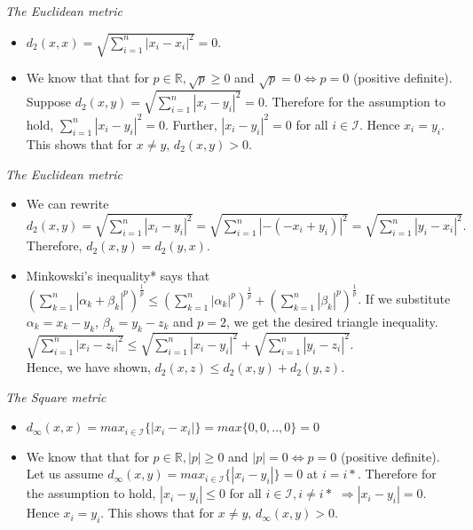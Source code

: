 \begin{frame}
\textit{The Euclidean metric}\hfill\break
\begin{itemize}
    \item $d_2(x,x) = \sqrt{\sum_{i=1}^{n} |x_i - x_i|^2} = 0$.\hfill\break
    \item We know
    that that for $p \in \mathbb{R}, \sqrt{p}\geq0$ and $\sqrt{p} = 0 \iff p =
    0$ (positive definite). \hfill\break
    \hfill\break
    Suppose $d_2(x,y) = \sqrt{\sum_{i=1}^{n} |x_i - y_i|^2} = 0$. \hfill\break
    \hfill\break
    Therefore for the assumption to hold,
    $\sum_{i=1}^{n} |x_i - y_i|^2 = 0$. Further, $ |x_i - y_i|^2 = 0$ for all $i
    \in \mathcal{I}$. Hence $x_i = y_i$. This shows that for $x\neq y$,
    $d_2(x,y)>0$.
\end{itemize}
\end{frame}


\begin{frame}
\textit{The Euclidean metric}\hfill\break
\begin{itemize}
    \item We can rewrite $d_2(x,y) = \sqrt{\sum_{i=1}^{n} |x_i - y_i|^2} =
    \sqrt{\sum_{i=1}^{n} |- (- x_i + y_i)|^2} = \sqrt{\sum_{i=1}^{n} |y_i - x_i|^2}.$ Therefore, $d_2(x,y) =
    d_2(y,x).$\hfill\break
    \pause
    \item Minkowski's inequality* says that
    $(\sum_{k=1}^{n}|\alpha_k+\beta_k|^p)^\frac{1}{p} \leq
    (\sum_{k=1}^{n}|\alpha_k|^p)^\frac{1}{p} +
    (\sum_{k=1}^{n}|\beta_k|^p)^\frac{1}{p}$.\hfill\break
    \hfill\break
    If we substitute $\alpha_k =
    x_k-y_k$, $\beta_k = y_k - z_k$ and $p=2$, we get the desired triangle inequality.\hfill\break
    $ \sqrt{\sum_{i=1}^{n} |x_i - z_i|^2} \leq  \sqrt{\sum_{i=1}^{n} |x_i -
    y_i|^2} +  \sqrt{\sum_{i=1}^{n} |y_i - z_i|^2}$. \\ Hence, we have shown,
    $d_2(x,z) \leq d_2(x,y)+d_2(y,z).$
\end{itemize}
\end{frame}

\begin{frame}
\textit{The Square metric}\hfill\break
\begin{itemize}
     \item $d_{\infty}(x,x) = max_{i\in \mathcal{I}}\{|x_i - x_i|\} = max\{0,
    0,..,0\} = 0$\hfill\break
    \item We know that that for $p \in \mathbb{R}, |p|\geq 0$ and $|p| = 0
    \iff p = 0$ (positive definite). \hfill\break
    \hfill\break
    Let us assume $d_{\infty}(x,y) = max_{i\in \mathcal{I}}\{|x_i - y_i|\} = 0$
    at $i=i*$. \hfill\break\hfill\break
    Therefore for the assumption to hold, $|x_i
    - y_i| \leq 0$ for all $i \in \mathcal{I}, i\neq i*$ $\Rightarrow |x_i -
    y_i| = 0$. Hence $x_i = y_i$. This shows that
    for $x\neq y$, $d_{\infty}(x,y)>0$.
\end{itemize}
\end{frame}

